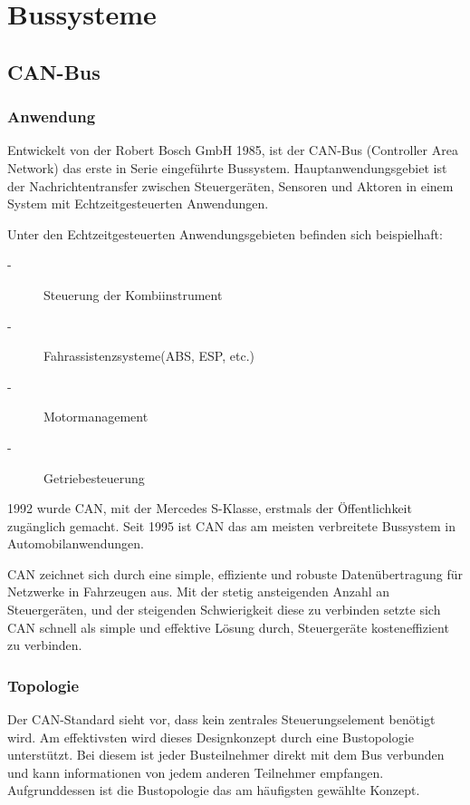 

\section{Bussysteme}

\subsection{CAN-Bus}
    \subsubsection{Anwendung}
    Entwickelt von der Robert Bosch GmbH 1985, ist der CAN-Bus (Controller Area Network) 
    das erste in Serie eingeführte Bussystem. Hauptanwendungsgebiet ist der
    Nachrichtentransfer zwischen Steuergeräten, Sensoren und Aktoren in 
    einem System mit Echtzeitgesteuerten Anwendungen.~\cite{LA_CAN1}

    Unter den Echtzeitgesteuerten Anwendungsgebieten befinden sich beispielhaft:
    \begin{description}
    \item[-] Steuerung der Kombiinstrument
    \item[-] Fahrassistenzsysteme(ABS, ESP, etc.)
    \item[-] Motormanagement
    \item[-] Getriebesteuerung
    \end{description}
    1992 wurde CAN, mit der Mercedes S-Klasse, erstmals der Öffentlichkeit zugänglich gemacht. 
    Seit 1995 ist CAN das am meisten verbreitete Bussystem in Automobilanwendungen.
 
    CAN zeichnet sich durch eine simple, effiziente und robuste Datenübertragung für Netzwerke in 
    Fahrzeugen aus. Mit der stetig ansteigenden Anzahl an Steuergeräten, und der steigenden 
    Schwierigkeit diese zu verbinden setzte sich CAN schnell als simple und effektive 
    Lösung durch, Steuergeräte kosteneffizient zu verbinden.~\cite{LA_CAN2}

    \subsubsection{Topologie}
    Der CAN-Standard sieht vor, dass kein zentrales Steuerungselement benötigt wird.
    Am effektivsten wird dieses Designkonzept durch eine Bustopologie unterstützt. Bei diesem
    ist jeder Busteilnehmer direkt mit dem Bus verbunden und kann informationen von jedem anderen
    Teilnehmer empfangen. Aufgrunddessen ist die Bustopologie das am häufigsten gewählte Konzept.
    ~\cite{reif2011bosch}
    
